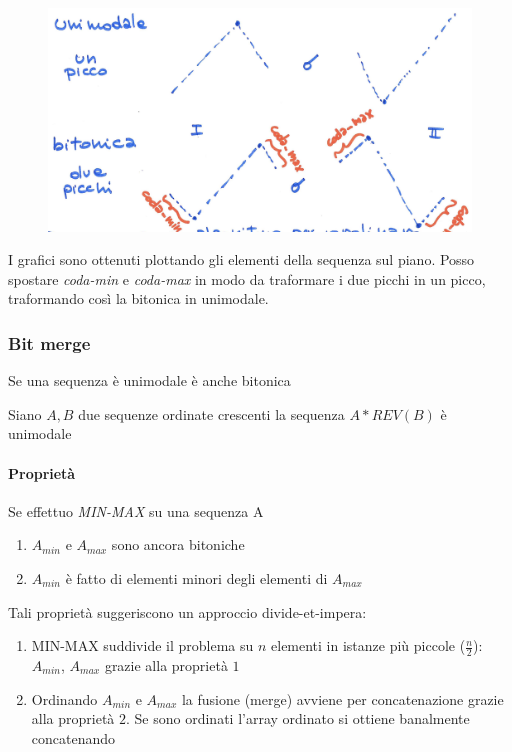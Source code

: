 \begin{figure}[h]
    \centering
    \includegraphics[scale=0.35]{images/bitonica2.png}
\end{figure}


I grafici sono ottenuti plottando gli elementi della sequenza sul piano. Posso spostare \textit{coda-min} e \textit{coda-max} in modo da traformare i due picchi in un picco, traformando così la bitonica in unimodale.

\subsubsection{Bit merge}
\begin{osservazione}
    Se una sequenza è unimodale è anche bitonica
\end{osservazione}

\begin{osservazione}
    Siano $A, B$ due sequenze ordinate crescenti la sequenza $A * REV(B)$ è unimodale
\end{osservazione}

\paragraph{Proprietà} Se effettuo \textit{MIN-MAX} su una sequenza A
\begin{enumerate}
    \item $A_{min}$ e $A_{max}$ sono ancora bitoniche
    \item $A_{min}$ è fatto di elementi minori degli elementi di $A_{max}$
\end{enumerate}

Tali proprietà suggeriscono un approccio divide-et-impera:
\begin{enumerate}
    \item MIN-MAX suddivide il problema su $n$ elementi in istanze più piccole ($\frac{n}{2}$): $A_{min}$, $A_{max}$  grazie alla proprietà $1$
    \item Ordinando $A_{min}$ e $A_{max}$ la fusione (merge) avviene per concatenazione grazie alla proprietà $2$. Se sono ordinati l'array ordinato si ottiene banalmente concatenando
\end{enumerate}

